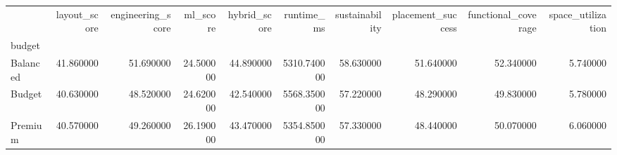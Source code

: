 \begin{tabular}{lrrrrrrrrr}
 & layout_score & engineering_score & ml_score & hybrid_score & runtime_ms & sustainability & placement_success & functional_coverage & space_utilization \\
budget &  &  &  &  &  &  &  &  &  \\
Balanced & 41.860000 & 51.690000 & 24.500000 & 44.890000 & 5310.740000 & 58.630000 & 51.640000 & 52.340000 & 5.740000 \\
Budget & 40.630000 & 48.520000 & 24.620000 & 42.540000 & 5568.350000 & 57.220000 & 48.290000 & 49.830000 & 5.780000 \\
Premium & 40.570000 & 49.260000 & 26.190000 & 43.470000 & 5354.850000 & 57.330000 & 48.440000 & 50.070000 & 6.060000 \\
\end{tabular}
